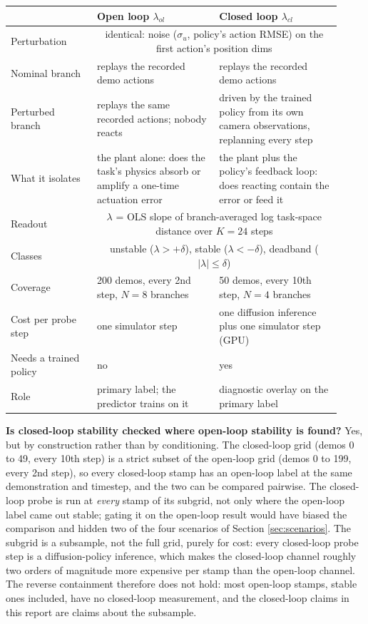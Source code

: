 \documentclass[11pt]{article}
\begin{document}
\begin{center}
\small
\begin{tabular}{@{}p{0.24\linewidth}p{0.34\linewidth}p{0.34\linewidth}@{}}
\toprule
 & \textbf{Open loop} $\lambda_{ol}$ & \textbf{Closed loop} $\lambda_{cl}$ \\
\midrule
Perturbation & \multicolumn{2}{c}{identical: noise ($\sigma_u$, policy's action
RMSE) on the first action's position dims} \\
\addlinespace
Nominal branch & replays the recorded demo actions & replays the recorded demo
actions \\
\addlinespace
Perturbed branch & replays the same recorded actions; nobody reacts & driven by
the trained policy from its own camera observations, replanning every step \\
\addlinespace
What it isolates & the plant alone: does the task's physics absorb or amplify a
one-time actuation error & the plant plus the policy's feedback loop: does
reacting contain the error or feed it \\
\addlinespace
Readout & \multicolumn{2}{c}{$\lambda$ = OLS slope of branch-averaged log
task-space distance over $K=24$ steps} \\
\addlinespace
Classes & \multicolumn{2}{c}{unstable ($\lambda > +\delta$), stable
($\lambda < -\delta$), deadband ($|\lambda| \leq \delta$)} \\
\addlinespace
Coverage & 200 demos, every 2nd step, $N=8$ branches & 50 demos, every 10th
step, $N=4$ branches \\
\addlinespace
Cost per probe step & one simulator step & one diffusion inference plus one
simulator step (GPU) \\
\addlinespace
Needs a trained policy & no & yes \\
\addlinespace
Role & primary label; the predictor trains on it & diagnostic overlay on the
primary label \\
\bottomrule
\end{tabular}
\end{center}

\textbf{Is closed-loop stability checked where open-loop stability is found?}
Yes, but by construction rather than by conditioning. The closed-loop grid
(demos 0 to 49, every 10th step) is a strict subset of the open-loop grid
(demos 0 to 199, every 2nd step), so every closed-loop stamp has an open-loop
label at the same demonstration and timestep, and the two can be compared
pairwise. The closed-loop probe is run at \emph{every} stamp of its subgrid,
not only where the open-loop label came out stable; gating it on the open-loop
result would have biased the comparison and hidden two of the four scenarios
of Section \ref{sec:scenarios}. The subgrid is a subsample, not the full grid,
purely for cost: every closed-loop probe step is a diffusion-policy inference,
which makes the closed-loop channel roughly two orders of magnitude more
expensive per stamp than the open-loop channel. The reverse containment
therefore does not hold: most open-loop stamps, stable ones included, have no
closed-loop measurement, and the closed-loop claims in this report are claims
about the subsample.
\end{document}
